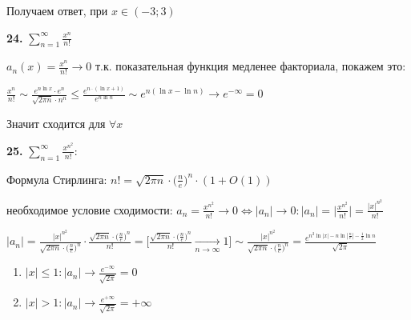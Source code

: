 Получаем ответ, при $x \in (-3; 3)$

\textbf{24.} $\sum_{n=1}^{\infty} \frac{x^n}{n!}$

$a_n(x) = \frac{x^n}{n!} \to 0$ т.к. показательная функция медленее факториала, покажем это:

$\frac{x^n}{n!} \sim \frac{e^{n \ln x}\cdot e^n}{\sqrt{2\pi n} \cdot n^n} \leq \frac{e^{n\cdot (\ln x + 1)}}{e^{n\ln n}} \sim e^{n(\ln x - \ln n)} \to e^{-\infty} = 0$

Значит сходится для $\forall x$

\textbf{25.} $\sum_{n=1}^{\infty} {\frac{x^{n^2}}{n!}}:$

Формула Стирлинга: $n!=\sqrt{2 \pi n} \cdot \Big( \frac{n}{e} \Big)^n \cdot (1+O(1)) $

необходимое условие сходимости: $a_n=\frac{x^{n^2}}{n!} \longrightarrow 0 \Longleftrightarrow |a_n| \longrightarrow 0: |a_n|=\Big| \frac{x^{n^2}}{n!} \Big|=\frac{|x|^{n^2}}{n!}$

$|a_n|=\frac{|x|^{n^2}}{\sqrt{2 \pi n}\cdot \big( \frac{n}{e} \big)^n}\cdot \frac{\sqrt{2 \pi n}\cdot \Big( \frac{n}{e} \Big)^n}{n!}=\Big[ \frac{\sqrt{2 \pi n}\cdot \Big( \frac{n}{e} \Big)^n}{n!} \xrightarrow [n \to \infty]{} 1 \Big] \sim \frac{|x|^{n^2}}{\sqrt{2 \pi n}\cdot \big( \frac{n}{e} \big)^n}=\frac{e ^ {n^2 \ln|x|-n\ln|\frac{n}{e}|-\frac{1}{2}\ln n}}{\sqrt{2 \pi}} $ 
 
\begin{enumerate}
	\item $|x| \leq 1: |a_n| \longrightarrow \frac{e^{-\infty}}{\sqrt{2\pi}}=0$
	\item $|x| > 1: |a_n| \longrightarrow \frac{e^{+\infty}}{\sqrt{2\pi}}=+\infty$
\end{enumerate}
